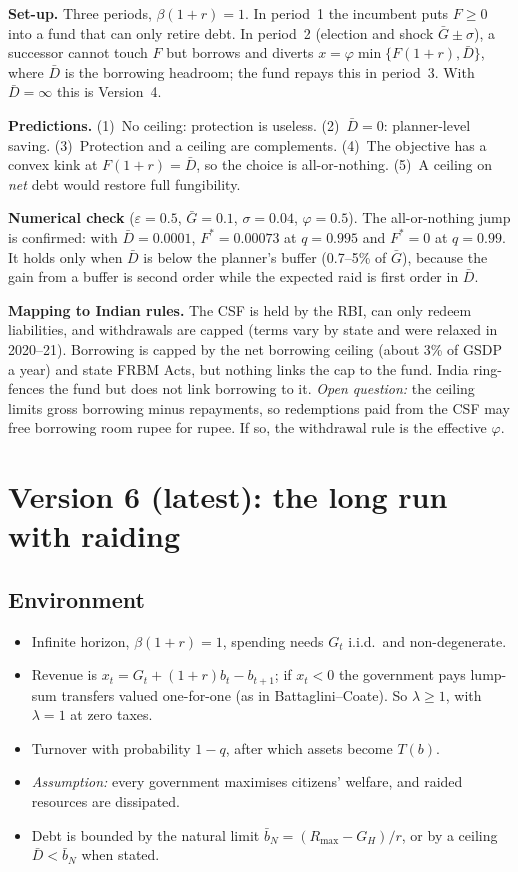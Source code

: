 \documentclass[11pt]{article}
\begin{document}
\textbf{Set-up.} Three periods, $\beta(1+r)=1$. In period~1 the incumbent puts $F\ge0$ into a fund that can only retire debt. In period~2 (election and shock $\bar G\pm\sigma$), a successor cannot touch $F$ but borrows and diverts $x=\varphi\min\{F(1+r),\bar D\}$, where $\bar D$ is the borrowing headroom; the fund repays this in period~3. With $\bar D=\infty$ this is Version~4.

\textbf{Predictions.} (1)~No ceiling: protection is useless. (2)~$\bar D=0$: planner-level saving. (3)~Protection and a ceiling are complements. (4)~The objective has a convex kink at $F(1+r)=\bar D$, so the choice is all-or-nothing. (5)~A ceiling on \emph{net} debt would restore full fungibility.

\textbf{Numerical check} ($\varepsilon=0.5$, $\bar G=0.1$, $\sigma=0.04$, $\varphi=0.5$). The all-or-nothing jump is confirmed: with $\bar D=0.0001$, $F^*=0.00073$ at $q=0.995$ and $F^*=0$ at $q=0.99$. It holds only when $\bar D$ is below the planner's buffer (0.7--5\% of $\bar G$), because the gain from a buffer is second order while the expected raid is first order in $\bar D$.

\textbf{Mapping to Indian rules.} The CSF is held by the RBI, can only redeem liabilities, and withdrawals are capped (terms vary by state and were relaxed in 2020--21). Borrowing is capped by the net borrowing ceiling (about 3\% of GSDP a year) and state FRBM Acts, but nothing links the cap to the fund. India ring-fences the fund but does not link borrowing to it. \emph{Open question:} the ceiling limits gross borrowing minus repayments, so redemptions paid from the CSF may free borrowing room rupee for rupee. If so, the withdrawal rule is the effective $\varphi$.

\section{Version 6 (latest): the long run with raiding}

\subsection{Environment}
\begin{itemize}
\item Infinite horizon, $\beta(1+r)=1$, spending needs $G_t$ i.i.d.\ and non-degenerate.
\item Revenue is $x_t=G_t+(1+r)b_t-b_{t+1}$; if $x_t<0$ the government pays lump-sum transfers valued one-for-one (as in Battaglini--Coate). So $\lambda\ge1$, with $\lambda=1$ at zero taxes.
\item Turnover with probability $1-q$, after which assets become $T(b)$.
\item \emph{Assumption:} every government maximises citizens' welfare, and raided resources are dissipated.
\item Debt is bounded by the natural limit $\bar b_N=(R_{\max}-G_H)/r$, or by a ceiling $\bar D<\bar b_N$ when stated.
\end{itemize}
\end{document}
